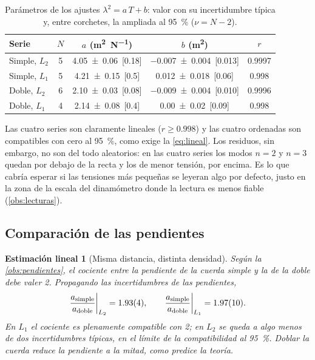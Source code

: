\documentclass[a4paper,11pt]{amsart}
\numberwithin{equation}{section}
\theoremstyle{cienplano}
\theoremstyle{ciendef}
\newtheorem{estimacion}[proposicion]{Estimación lineal}
\theoremstyle{cienobs}
\begin{document}
\begin{table}[ht]
\centering
\caption{Parámetros de los ajustes $\lambda^{2}=a\,T+b$: valor con su
incertidumbre típica y, entre corchetes, la ampliada al \SI{95}{\percent}
($\nu=N-2$).}
\label{tab:ajustes}
\renewcommand{\arraystretch}{1.25}
\begin{tabular}{@{}l c c c c@{}}
\toprule
Serie & $N$ & $a$ (\si{\meter\squared\per\newton}) & $b$ (\si{\meter\squared}) & $r$ \\
\midrule
Simple, $L_2$ & 5 & \num{4,05 \pm 0,06}\ [\num{0,18}] & \num{-0,007 \pm 0,004}\ [\num{0,013}] & \num{0,9997} \\
Simple, $L_1$ & 5 & \num{4,21 \pm 0,15}\ [\num{0,5}]  & \num{0,012 \pm 0,018}\ [\num{0,06}]   & \num{0,998}  \\
Doble, $L_2$  & 6 & \num{2,10 \pm 0,03}\ [\num{0,08}] & \num{-0,009 \pm 0,004}\ [\num{0,010}] & \num{0,9996} \\
Doble, $L_1$  & 4 & \num{2,14 \pm 0,08}\ [\num{0,4}]  & \num{0,00 \pm 0,02}\ [\num{0,09}]     & \num{0,998}  \\
\bottomrule
\end{tabular}
\end{table}

Las cuatro series son claramente lineales ($r\geq\num{0,998}$) y las cuatro
ordenadas son compatibles con cero al \SI{95}{\percent}, como exige la
\cref{eq:lineal}. Los residuos, sin embargo, no son del todo aleatorios: en
las cuatro series los modos $n=2$ y $n=3$ quedan por debajo de la recta y los
de menor tensión, por encima. Es lo que cabría esperar si las tensiones más
pequeñas se leyeran algo por defecto, justo en la zona de la escala del
dinamómetro donde la lectura es menos fiable (\cref{obs:lecturas}).

\subsection{Comparación de las pendientes}\label{sec:comparacion}
\begin{estimacion}[Misma distancia, distinta densidad]\label{est:densidad}
Según la \cref{obs:pendientes}, el cociente entre la pendiente de la cuerda
simple y la de la doble debe valer 2. Propagando las incertidumbres de las
pendientes,
\begin{equation}\label{eq:cocientes}
  \frac{a_{\text{simple}}}{a_{\text{doble}}}\bigg|_{L_2}=\num{1,93 \pm 0,04},
  \qquad
  \frac{a_{\text{simple}}}{a_{\text{doble}}}\bigg|_{L_1}=\num{1,97 \pm 0,10}.
\end{equation}
En $L_1$ el cociente es plenamente compatible con 2; en $L_2$ se queda a
algo menos de dos incertidumbres típicas, en el límite de la compatibilidad
al \SI{95}{\percent}. Doblar la cuerda reduce la pendiente a la mitad, como
predice la teoría.
\end{estimacion}
\end{document}
